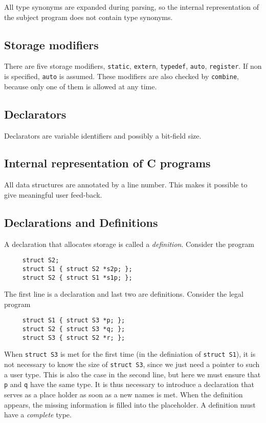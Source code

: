 \begin{docpart}
All type synonyms are expanded during parsing, so the internal
representation of the subject program does not contain type synonyms.

\subsection{Storage modifiers}
There are five storage modifiers, \texttt{static}, \texttt{extern},
\texttt{typedef}, \texttt{auto}, \texttt{register}. If non is
specified, \texttt{auto} is assumed.  These modifiers are also checked
by \texttt{combine}, because only one of them is allowed at any time.

\subsection{Declarators}
Declarators are variable identifiers and possibly a bit-field size.

\subsection{Internal representation of C programs}
All data structures are annotated by a line number. This makes it
possible to give meaningful user feed-back.

\subsection{Declarations and Definitions}
A declaration that allocates storage is called a
\emph{definition}. Consider the program
  \begin{verbatim}
     struct S2;
     struct S1 { struct S2 *s2p; };
     struct S2 { struct S1 *s1p; };
  \end{verbatim}
The first line is a declaration and last two are definitions. Consider
the legal program
  \begin{verbatim}
     struct S1 { struct S3 *p; };
     struct S2 { struct S3 *q; };
     struct S3 { struct S2 *r; };
  \end{verbatim}
When \texttt{struct S3} is met for the first time (in the definiation
of \texttt{struct S1}), it is not necessary to know the size of
\texttt{struct S3}, since we just need a pointer to such a user type.
This is also the case in the second line, but here we must ensure that
\texttt{p} and \texttt{q} have the same type. It is thus necessary to
introduce a declaration that serves as a place holder as soon as a new
names is met. When the definition appears, the missing information is
filled into the placeholder. A definition must have a \emph{complete}
type.



\end{docpart}
